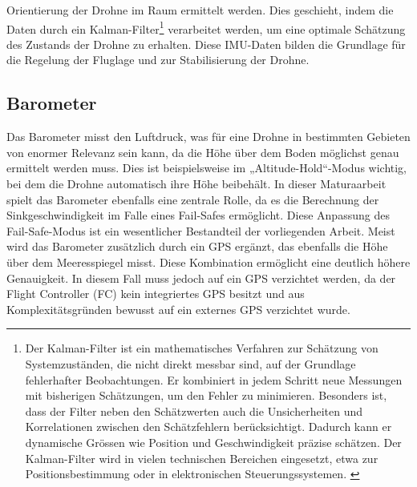 Orientierung der Drohne im Raum ermittelt werden. Dies geschieht, indem die Daten durch ein Kalman-Filter\footnote{Der Kalman-Filter ist ein mathematisches Verfahren zur Schätzung von Systemzuständen, die nicht direkt messbar sind, auf der Grundlage fehlerhafter Beobachtungen. Er kombiniert in jedem Schritt neue Messungen mit bisherigen Schätzungen, um den Fehler zu minimieren. Besonders ist, dass der Filter neben den Schätzwerten auch die Unsicherheiten und Korrelationen zwischen den Schätzfehlern berücksichtigt. Dadurch kann er dynamische Grössen wie Position und Geschwindigkeit präzise schätzen. Der Kalman-Filter wird in vielen technischen Bereichen eingesetzt, etwa zur Positionsbestimmung oder in elektronischen Steuerungssystemen. \cite{Kalman}} verarbeitet werden, um eine optimale Schätzung des Zustands der Drohne zu erhalten. Diese IMU-Daten bilden die Grundlage für die Regelung der Fluglage und zur Stabilisierung der Drohne.

\subsection{Barometer}  \label{sec:Barometer}
Das Barometer misst den Luftdruck, was für eine Drohne in bestimmten Gebieten von enormer Relevanz sein kann, da die Höhe über dem Boden möglichst genau ermittelt werden muss. Dies ist beispielsweise im „Altitude-Hold“-Modus wichtig, bei dem die Drohne automatisch ihre Höhe beibehält. In dieser Maturaarbeit spielt das Barometer ebenfalls eine zentrale Rolle, da es die Berechnung der Sinkgeschwindigkeit im Falle eines Fail-Safes ermöglicht. Diese Anpassung des Fail-Safe-Modus ist ein wesentlicher Bestandteil der vorliegenden Arbeit. Meist wird das Barometer zusätzlich durch ein GPS ergänzt, das ebenfalls die Höhe über dem Meeresspiegel misst. Diese Kombination ermöglicht eine deutlich höhere Genauigkeit. In diesem Fall muss jedoch auf ein GPS verzichtet werden, da der Flight Controller (FC) kein integriertes GPS besitzt und aus Komplexitätsgründen bewusst auf ein externes GPS verzichtet wurde.